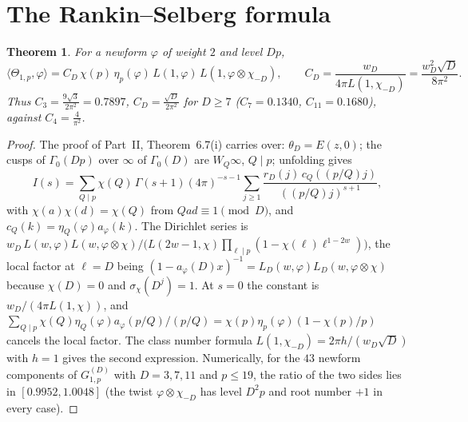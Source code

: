 \documentclass[11pt]{amsart}
\newtheorem{theorem}{Theorem}[section]
\theoremstyle{remark}
\begin{document}
\section{The Rankin--Selberg formula}
\begin{theorem}\label{thm:RS}
For a newform $\varphi$ of weight $2$ and level $Dp$,
\[
\langle\Theta_{1,p},\varphi\rangle=C_D\,\chi(p)\,\eta_p(\varphi)\,L(1,\varphi)\,L(1,\varphi\otimes\chi_{-D}),\qquad C_D=\frac{w_D}{4\pi L(1,\chi_{-D})}=\frac{w_D^2\sqrt D}{8\pi^2}.
\]
Thus $C_3=\frac{9\sqrt3}{2\pi^2}=0.7897$, $C_D=\frac{\sqrt D}{2\pi^2}$ for $D\ge7$ ($C_7=0.1340$, $C_{11}=0.1680$), against $C_4=\frac4{\pi^2}$.
\end{theorem}
\begin{proof}
The proof of Part~II, Theorem~6.7(i) carries over: $\theta_D=E(z,0)$; the cusps of $\Gamma_0(Dp)$ over $\infty$ of $\Gamma_0(D)$ are $W_Q\infty$, $Q\mid p$; unfolding gives
\[
I(s)=\sum_{Q\mid p}\chi(Q)\,\Gamma(s+1)(4\pi)^{-s-1}\sum_{j\ge1}\frac{r_D(j)\,c_Q((p/Q)j)}{((p/Q)j)^{s+1}},
\]
with $\chi(a)\chi(d)=\chi(Q)$ from $Qad\equiv1\pmod D$, and $c_Q(k)=\eta_Q(\varphi)a_\varphi(k)$. The Dirichlet series is $w_D\,L(w,\varphi)L(w,\varphi\otimes\chi)/\bigl(L(2w-1,\chi)\prod_{\ell\mid p}(1-\chi(\ell)\ell^{1-2w})\bigr)$, the local factor at $\ell=D$ being $(1-a_\varphi(D)x)^{-1}=L_D(w,\varphi)L_D(w,\varphi\otimes\chi)$ because $\chi(D)=0$ and $\sigma_\chi(D^j)=1$. At $s=0$ the constant is $w_D/(4\pi L(1,\chi))$, and $\sum_{Q\mid p}\chi(Q)\eta_Q(\varphi)a_\varphi(p/Q)/(p/Q)=\chi(p)\eta_p(\varphi)(1-\chi(p)/p)$ cancels the local factor. The class number formula $L(1,\chi_{-D})=2\pi h/(w_D\sqrt D)$ with $h=1$ gives the second expression. Numerically, for the $43$ newform components of $G^{(D)}_{1,p}$ with $D=3,7,11$ and $p\le19$, the ratio of the two sides lies in $[0.9952,1.0048]$ (the twist $\varphi\otimes\chi_{-D}$ has level $D^2p$ and root number $+1$ in every case).
\end{proof}
\end{document}
